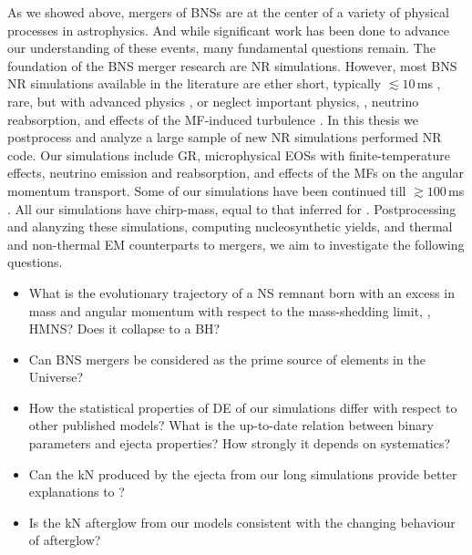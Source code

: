 As we showed above, mergers of \acp{BNS} are at the center of a variety of 
physical processes in astrophysics. And while significant work 
has been done to advance our understanding of these events, many 
fundamental questions remain. 
%
The foundation of the \ac{BNS} merger research are \ac{NR} simulations.
However, most \ac{BNS} \ac{NR} simulations available in the literature 
are ether short, typically ${\lesssim}10\,$ms \pmerg, rare, but with 
advanced physics \citep[\eg][]{Vincent:2019kor}, 
or neglect important physics, \eg, neutrino reabsorption, 
and effects of the \ac{MF}-induced turbulence \citep[\eg][]{Lehner:2016lxy}. 
%
In this thesis we postprocess and analyze a large sample of new 
\ac{NR} simulations performed \wisky{} \ac{NR} code.
Our simulations include \ac{GR}, microphysical \acp{EOS} with finite-temperature 
effects, neutrino emission and reabsorption, and effects of the 
\acp{MF} on the angular momentum transport. Some of 
our simulations have been continued till ${\gtrsim}100\,$ms \pmerg{}. 
All our simulations have chirp-mass, equal to that inferred for 
\GW{}. 
%
Postprocessing and alanyzing these simulations, 
computing \rproc{} nucleosynthetic yields, 
and thermal and non-thermal \ac{EM} counterparts to mergers, 
we aim to investigate the following questions.

\begin{itemize}
    \item What is the evolutionary trajectory of a \ac{NS} remnant born with 
    an excess in mass and angular momentum with respect to the mass-shedding 
    limit, \ie, \ac{HMNS}? Does it collapse to a \ac{BH}?
    \item 
    Can \ac{BNS} mergers be considered as 
    the prime source of \rproc{} elements in the Universe?
    \item How the statistical properties of \ac{DE} of our simulations 
    differ with respect to other published models? What is the 
    up-to-date relation between binary parameters and ejecta properties? 
    How strongly it depends on systematics?
    \item Can the \ac{kN} produced by the ejecta from our long simulations 
    provide better explanations to \AT{}? 
    \item Is the \ac{kN} afterglow from our models consistent 
    with the changing behaviour of \GRB{} afterglow? 
\end{itemize}

